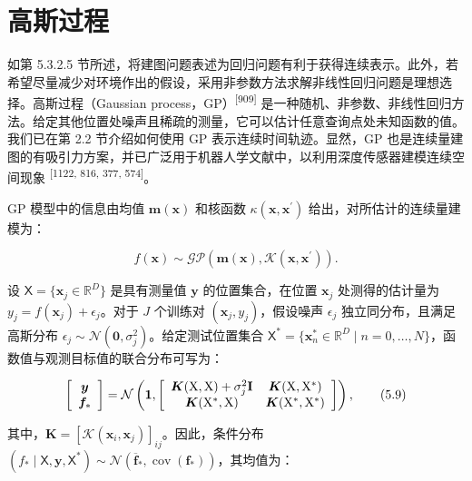 \section{高斯过程}

如第 5.3.2.5 节所述，将建图问题表述为回归问题有利于获得连续表示。此外，若希望尽量减少对环境作出的假设，采用非参数方法求解非线性回归问题是理想选择。高斯过程（Gaussian process，GP）\textsuperscript{[909]} 是一种随机、非参数、非线性回归方法。给定其他位置处噪声且稀疏的测量，它可以估计任意查询点处未知函数的值。我们已在第 2.2 节介绍如何使用 GP 表示连续时间轨迹。显然，GP 也是连续量建图的有吸引力方案，并已广泛用于机器人学文献中，以利用深度传感器建模连续空间现象 \textsuperscript{[1122, 816, 377, 574]}。

GP 模型中的信息由均值 $\pmb { m }(\pmb { x })$ 和核函数 $\kappa(\pmb { x },\pmb { x } ^ {\prime})$ 给出，对所估计的连续量建模为：

\begin{equation}
f (\boldsymbol {x}) \sim \mathcal {GP} \left(\boldsymbol {m} (\boldsymbol {x}), \boldsymbol {\mathcal {K}} (\boldsymbol {x}, \boldsymbol {x} ^ {\prime})\right).\tag{5.8}
\end{equation}

设 $\mathsf { X }=\{\pmb { x } _ { j } \in \mathbb { R } ^ { D }\}$ 是具有测量值 $\pmb {y}$ 的位置集合，在位置 $\pmb {x}_j$ 处测得的估计量为 $y _ {j}=f(\pmb {x}_j)+\epsilon_j$。对于 $J$ 个训练对 $(\pmb {x}_j,y_j)$，假设噪声 $\epsilon_j$ 独立同分布，且满足高斯分布 $\epsilon_j\sim\mathcal {N}(\mathbf {0},\sigma_j^2)$。给定测试位置集合 $\mathsf { X } ^ {*}=\{\pmb {x}_n^*\in\mathbb {R}^D\mid n=0,\ldots,N\}$，函数值与观测目标值的联合分布可写为：

\begin{equation}
\left[ \begin{array}{c} \boldsymbol {y} \\ \boldsymbol {f} _ {*} \end{array} \right] = \mathcal {N} \left(\mathbf {1}, \left[ \begin{array}{c c} \boldsymbol {K} (\mathrm{X}, \mathrm{X}) + \sigma_ {j} ^ {2} \mathbf {I} & \boldsymbol {K} (\mathrm{X}, \mathrm{X} ^ {*}) \\ \boldsymbol {K} (\mathrm{X} ^ {*}, \mathrm{X}) & \boldsymbol {K} (\mathrm{X} ^ {*}, \mathrm{X} ^ {*}) \end{array} \right]\right),\tag{5.9}
\end{equation}

其中，$\pmb { K }=\left[\pmb {\mathcal { K }}(\pmb {x}_i,\pmb {x}_j)\right]_{ij}$。因此，条件分布 $(f_*\mid\mathsf {X},\pmb {y},\mathsf {X}^*)\sim\mathcal {N}(\overline{\pmb {f}}_*,\operatorname{cov}(\pmb {f}_*))$，其均值为：

